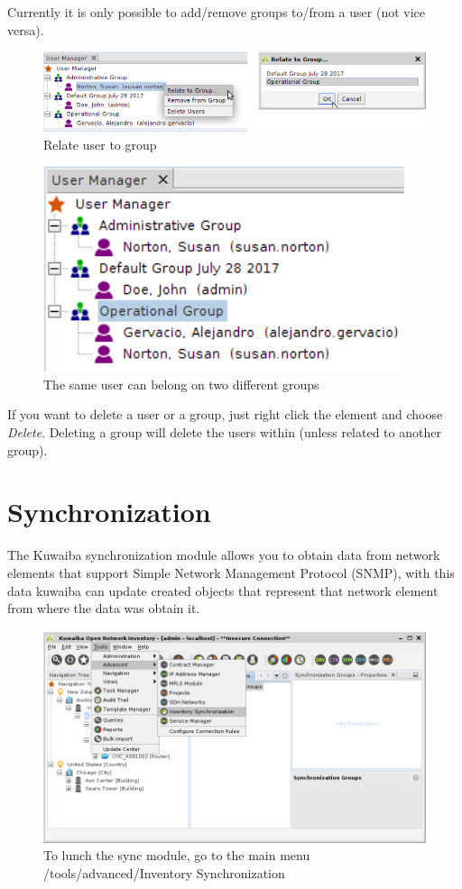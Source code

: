 \documentclass[a4paper]{article}
\begin{document}
		Currently it is only possible to add/remove groups to/from a user (not vice versa).\\
		\begin{figure}[h!]
			\centering
			\includegraphics[width=0.5\linewidth]{img/user_manager_relate_to_group.png}
			\caption{Relate user to group}
			\label{fig:user_manager_relate_to_group}
		\end{figure}
		
		\begin{figure}[h!]
			\centering
			\includegraphics[width=0.4\linewidth]{img/user_manager_user_and_groups.png}
			\caption{The same user can belong on two different groups}
			\label{fig:user_manager_user_and_groups}
		\end{figure}
		
		If you want to delete a user or a group, just right click the element and choose \textit{Delete}. Deleting a group will delete the users within (unless related to another group).
		
		\clearpage
		\section{Synchronization}\label{sec:sync}
			The Kuwaiba synchronization module allows you to obtain data from network elements that support Simple Network Management Protocol (SNMP), with this data kuwaiba can update created objects that represent that network element from where the data was obtain it.\\

			\begin{figure}[h!]
				\centering
				\includegraphics[width=0.8\linewidth]{img/sync_menu_open_sync_module.png}
				\caption{To lunch the sync module, go to the main menu /tools/advanced/Inventory Synchronization}
				\label{fig:sync_menu_open_sync_module}
			\end{figure}
		
\end{document}
